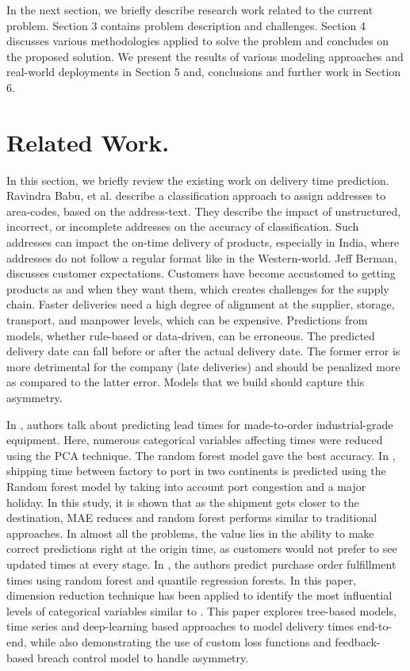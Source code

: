 \documentclass[twoside,leqno,twocolumn]{article}
\begin{document}
In the next section, we briefly describe research work related to the current problem. Section 3 contains problem description and challenges. Section 4 discusses various methodologies applied to solve the problem and concludes on the proposed solution. We present the results of various modeling approaches and real-world deployments in Section 5 and, conclusions and further work in Section 6.

\section{Related Work.}
In this section, we briefly review the existing work on delivery time prediction. Ravindra Babu, et al.\cite{10.1145/2837689.2837696} describe a classification approach to assign addresses to area-codes, based on the address-text. They describe the impact of unstructured, incorrect, or incomplete addresses on the accuracy of classification. Such addresses can impact the on-time delivery of products, especially in India, where addresses do not follow a regular format like in the Western-world. Jeff Berman\cite{RefWorks:1}, discusses customer expectations. Customers have become accustomed to getting products as and when they want them, which creates challenges for the supply chain. Faster deliveries need a high degree of alignment at the supplier, storage, transport, and manpower levels, which can be expensive. Predictions from models, whether rule-based or data-driven, can be erroneous. The predicted delivery date can fall before or after the actual delivery date. The former error is more detrimental for the company (late deliveries) and should be penalized more as compared to the latter error. Models that we build should capture this asymmetry\cite{christoffersen1996further}. 

In \cite{RefWorks:2}, authors talk about predicting lead times for made-to-order industrial-grade equipment. Here, numerous categorical variables affecting times were reduced using the PCA technique. The random forest model gave the best accuracy. In \cite{jonquais2019predicting}, shipping time between factory to port in two continents is predicted using the Random forest model by taking into account port congestion and a major holiday. In this study, it is shown that as the shipment gets closer to the destination, MAE reduces and random forest performs similar to traditional approaches. In almost all the problems, the value lies in the ability to make correct predictions right at the origin time, as customers would not prefer to see updated times at every stage. In \cite{liu2018predicting}, the authors predict purchase order fulfillment times using random forest and quantile regression forests. In this paper, dimension reduction technique has been applied to identify the most influential levels of categorical variables similar to \cite{RefWorks:2}. This paper explores tree-based models, time series and deep-learning based approaches to model delivery times end-to-end, while also demonstrating the use of custom loss functions and feedback-based breach control model to handle asymmetry.
\end{document}
